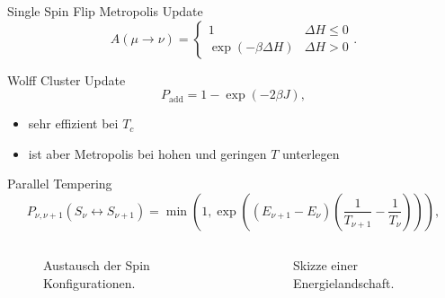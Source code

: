 \documentclass{beamer}
\newcommand{\brac}[1]{\ensuremath{\left(#1\right)}}
\begin{document}
        \begin{frame}{Single Spin Flip Metropolis Update \cite{Metropolis1953}}
            \begin{equation}
                A(\mu \to \nu) =
                \begin{cases}
                    1                            & \Delta H \le 0 \\
                    \exp{\brac{-\beta \Delta H}} & \Delta H > 0
                \end{cases}.
            \end{equation}
        \end{frame}

        \begin{frame}{Wolff Cluster Update \cite{Wolff1989}}
            \begin{equation}
                P_{\mathrm{add}} = 1-\exp\brac{-2\beta J},
            \end{equation}
            \pause
            \vspace{-1cm}
            \begin{itemize}[<+->]
                \item sehr effizient bei \(T_{c}\)
                \item ist aber Metropolis bei hohen und geringen \(T\) unterlegen
            \end{itemize}
        \end{frame}

        \begin{frame}{Parallel Tempering \cite{ParallelTempering1986}}
            \begin{equation}
                P_{\nu,\nu+1}(S_\nu \leftrightarrow S_{\nu+1}) = \min\brac{1,\exp\brac{\brac{E_{\nu+1}-E_\nu}\brac{\frac{1}{T_{\nu+1}}-\frac{1}{T_\nu}}}},
            \end{equation}
            \begin{columns}[b]
                \begin{column}{5cm}
                    \begin{figure}[htbp]
                        \centering
                        
                        \caption
                        {
                            Austausch der Spin Konfigurationen.
                        }
                    \end{figure}
                \end{column}
                \pause
                \begin{column}{6cm}
                    \begin{figure}[htbp]
                        \centering
                        
                        \caption
                        {
                            Skizze einer Energielandschaft.
                        }
                    \end{figure}
                \end{column}
            \end{columns}
        \end{frame}
\end{document}
